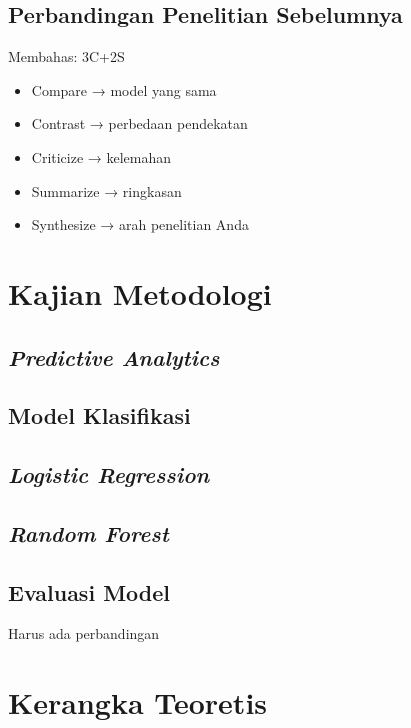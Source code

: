 \subsection{Perbandingan Penelitian Sebelumnya}
Membahas: 3C+2S
\begin{itemize}
    \item Compare → model yang sama
    \item Contrast → perbedaan pendekatan
    \item Criticize → kelemahan
    \item Summarize → ringkasan
    \item Synthesize → arah penelitian Anda
\end{itemize}

\section{Kajian Metodologi}
\label{sec:2_4}

\subsection{\textit{Predictive Analytics}}
\subsection{Model Klasifikasi}
\subsection{\textit{Logistic Regression}}
\subsection{\textit{Random Forest}}
\subsection{Evaluasi Model}
Harus ada perbandingan

\section{Kerangka Teoretis}
\label{sec:2_5}

